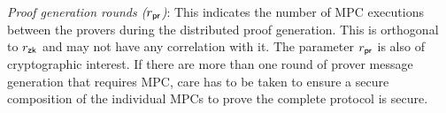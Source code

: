 \noindent\textit{Proof generation rounds ($r_\mathsf{pr}$)}:
This indicates the number of MPC executions between the provers during the distributed proof generation. 
 This is orthogonal to $r_\mathsf{zk}$ and may not have any correlation with it. %
The parameter $r_\mathsf{pr}$ is also of cryptographic interest. If there are more than one round of prover message generation that requires MPC, care has to be taken to ensure a secure composition of the individual MPCs to prove the complete protocol is secure.

